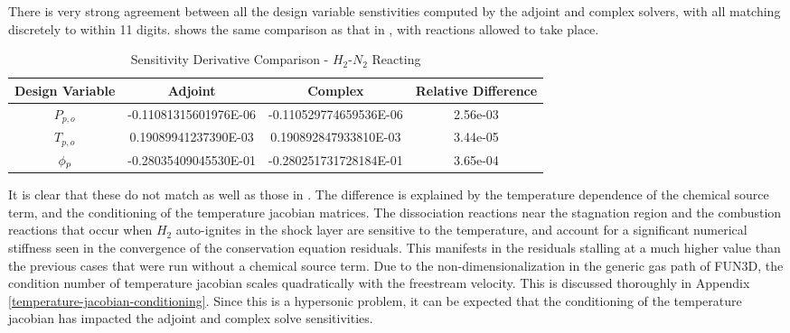 There is very strong agreement between all the design variable senstivities
computed by the adjoint and complex solvers, with all matching discretely to
within 11 digits.   shows the same comparison as
that in , with reactions allowed to take place.
\begin{table}[h]
  \centering
  \begin{tabular}{c|c|c|c}
    Design Variable & Adjoint & Complex & Relative Difference\\
    \hline
    $P_{p,o}$ & -0.11081315601976E-06 & -0.110529774659536E-06 & 2.56e-03 \\
    $T_{p,o}$ &  0.19089941237390E-03 &  0.190892847933810E-03 & 3.44e-05 \\
    $\phi_p$     & -0.28035409045530E-01 & -0.280251731728184E-01 & 3.65e-04
  \end{tabular}
  \caption{Sensitivity Derivative Comparison - $H_2$-$N_2$ Reacting}
  \label{tab:react-deriv-check}
\end{table}
It is clear that these do not match as well as those in
.  The difference is explained
by the temperature dependence of the chemical source term, and the conditioning
of the temperature jacobian matrices.  The dissociation reactions near the
stagnation region and the combustion reactions that occur when $H_2$
auto-ignites in the shock layer are sensitive to the temperature, and account
for a significant numerical stiffness seen in the convergence of the
conservation equation residuals.  This manifests in the residuals stalling at a
much higher value than the previous cases that were run without a chemical
source term.  Due to the non-dimensionalization in the generic gas path of
FUN3D, the condition number of temperature jacobian scales quadratically with
the freestream velocity.  This is discussed thoroughly in Appendix
\ref{temperature-jacobian-conditioning}. Since this is a hypersonic problem,
it can be expected that the conditioning of the temperature jacobian has
impacted the adjoint and complex solve sensitivities.
